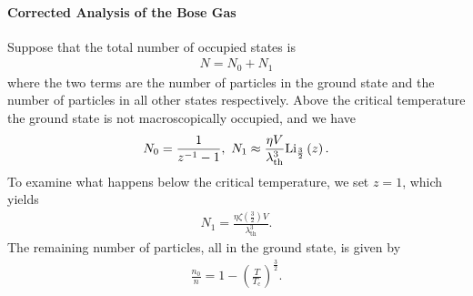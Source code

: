 \paragraph{Corrected Analysis of the Bose Gas}
Suppose that the total number of occupied states is
\begin{align*}
	N = N_{0} + N_{1}
\end{align*}
where the two terms are the number of particles in the ground state and the number of particles in all other states respectively. Above the critical temperature the ground state is not macroscopically occupied, and we have
\begin{align*}
	N_{0} = \frac{1}{z^{-1} - 1},\ N_{1} \approx \frac{\eta V}{\lambda_{\text{th}}^{3}}\text{Li}_{\frac{3}{2}}\left(z\right).
\end{align*}
To examine what happens below the critical temperature, we set $z = 1$, which yields
\begin{align*}
	N_{1} = \frac{\eta\zeta\left(\frac{3}{2}\right)V}{\lambda_{\text{th}}^{3}}.
\end{align*}
The remaining number of particles, all in the ground state, is given by
\begin{align*}
	\frac{n_{0}}{n} = 1 - \left(\frac{T}{T_{\text{c}}}\right)^{\frac{3}{2}}.
\end{align*}


